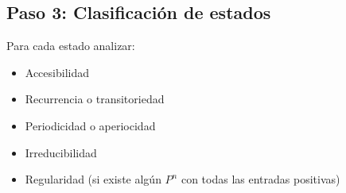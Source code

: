 \documentclass{article}
\begin{document}
\subsection*{Paso 3: Clasificaci\'on de estados}

Para cada estado analizar:

\begin{itemize}
  \item Accesibilidad
  \item Recurrencia o transitoriedad
  \item Periodicidad o aperiocidad
  \item Irreducibilidad
  \item Regularidad (si existe alg\'un $P^n$ con todas las entradas positivas)
\end{itemize}
\end{document}

